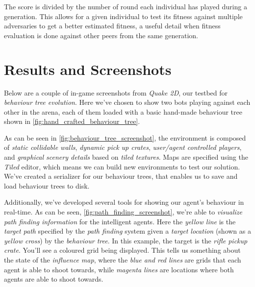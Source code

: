 \documentclass[a4paper, twocolumn]{article}
\begin{document}
        The score is divided by the number of round each individual has played during a generation. This allows for a given individual to test its fitness against multiple adversaries to get a better estimated fitness, a useful detail when fitness evaluation is done against other peers from the same generation.

    \section{Results and Screenshots} \label{sec:results_and_screenshots}

        Below are a couple of in-game screenshots from \emph{Quake 2D}, our testbed for \emph{behaviour tree evolution}. Here we've chosen to show two bots playing against each other in the arena, each of them loaded with a basic hand-made behaviour tree shown in \cref{fig:hand_crafted_behaviour_tree}.

        As can be seen in \cref{fig:behaviour_tree_screenshot}, the environment is composed of \emph{static collidable walls}, \emph{dynamic pick up crates}, \emph{user/agent controlled players}, and \emph{graphical scenery details} based on \emph{tiled textures}. Maps are specified using the \emph{Tiled} editor, which means we can build new environments to test our solution. We've created a serializer for our behaviour trees, that enables us to save and load behaviour trees to disk.

        Additionally, we've developed several tools for showing our agent's behaviour in real-time. As can be seen, \cref{fig:path_finding_screenshot}, we're able to \emph{visualize path finding information} for the intelligent agents. Here the \emph{yellow line} is the \emph{target path} specified by the \emph{path finding} system given a \emph{target location} (shown as a \emph{yellow cross}) by the \emph{behaviour tree}. In this example, the target is the \emph{rifle pickup crate}. You'll see a coloured grid being displayed. This tells us something about the state of the \emph{influence map}, where the \emph{blue and red lines} are grids that each agent is able to shoot towards, while \emph{magenta lines} are locations where both agents are able to shoot towards.
\end{document}
